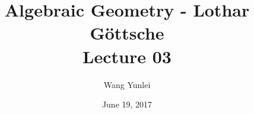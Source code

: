 \documentclass{amsart}
\theoremstyle{plain}
\theoremstyle{definition}
\theoremstyle{remark}
\numberwithin{equation}{section}
\begin{document}
\title[Complete-simple distributive lattices]
{Algebraic Geometry - Lothar G\"{o}ttsche \\
	Lecture 03}
\author{Wang Yunlei}
\date{June 19, 2017}
 
\maketitle

  
  
\end{document}
